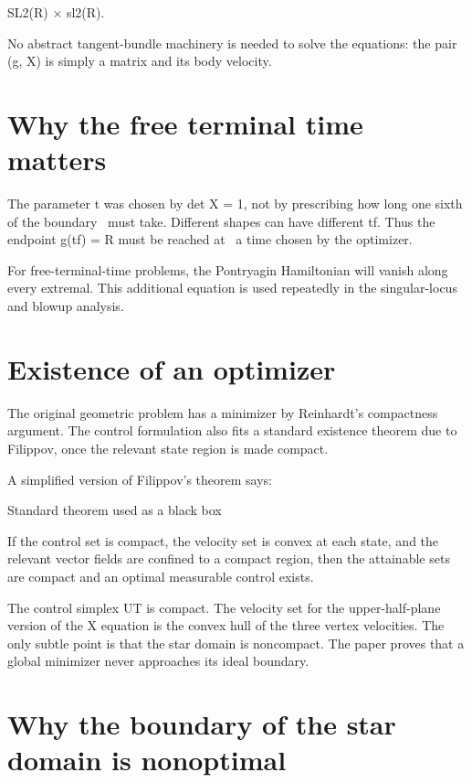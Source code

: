 SL2(R) × sl2(R).


No abstract tangent-bundle machinery is needed to solve the equations: the pair (g, X) is simply a matrix and its body velocity.


\section{Why the free terminal time matters}

\begin{displaytext}
The parameter t was chosen by det X = 1, not by prescribing how long one sixth of the boundary \
must take. Different shapes can have different tf. Thus the endpoint g(tf) = R must be reached at \
a time chosen by the optimizer.
\end{displaytext}

For free-terminal-time problems, the Pontryagin Hamiltonian will vanish along every extremal. This additional equation is used repeatedly in the singular-locus and blowup analysis.


\section{Existence of an optimizer}

The original geometric problem has a minimizer by Reinhardt’s compactness argument. The control formulation also fits a standard existence theorem due to Filippov, once the relevant state region is made compact.


A simplified version of Filippov’s theorem says:


\begin{insightbox}{Standard theorem used as a black box}
\end{insightbox}

If the control set is compact, the velocity set is convex at each state, and the relevant vector fields are confined to a compact region, then the attainable sets are compact and an optimal measurable control exists.


The control simplex UT is compact. The velocity set for the upper-half-plane version of the X equation is the convex hull of the three vertex velocities. The only subtle point is that the star domain is noncompact. The paper proves that a global minimizer never approaches its ideal boundary.


\section{Why the boundary of the star domain is nonoptimal}

